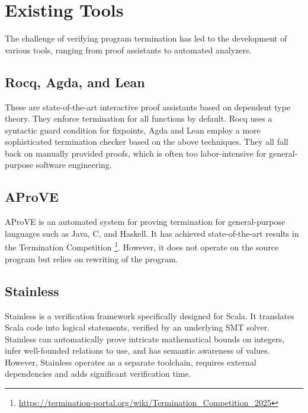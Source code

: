 \section{Existing Tools}
The challenge of verifying program termination has led to the development of
various tools, ranging from proof assistants to automated analyzers.

\subsection{Rocq, Agda, and Lean}
These are state-of-the-art interactive proof assistants based on dependent type
theory. They enforce termination for all functions by default.
Rocq uses a syntactic guard condition for fixpoints, Agda and Lean employ a more
sophisticated termination checker based on the above techniques.
They all fall back on manually provided proofs, which is often too
labor-intensive for general-purpose software engineering.

\subsection{AProVE}
AProVE \cite{AProVE} is an automated system for proving termination for
general-purpose languages such as Java, C, and Haskell. It has achieved
state-of-the-art results in the Termination Competition
\footnote{\url{https://termination-portal.org/wiki/Termination_Competition_2025}}.
However, it does not operate on the source program but relies on rewriting of
the program.

\subsection{Stainless}
Stainless \cite{DBLP:journals/corr/abs-1904-03482} is a verification framework
specifically designed for Scala. It translates Scala code into logical
statements, verified by an underlying SMT solver. Stainless can automatically
prove intricate mathematical bounds on integers, infer well-founded relations to
use, and has semantic awareness of values. However, Stainless operates as a
separate toolchain, requires external dependencies and adds significant
verification time.

